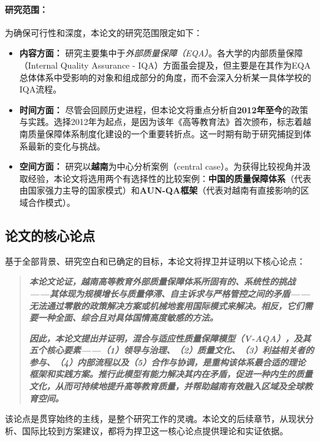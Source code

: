 \paragraph{研究范围：}
为确保可行性和深度，本论文的研究范围限定如下：
\begin{itemize}
    \item \textbf{内容方面：} 研究主要集中于\textit{外部质量保障（EQA）}。各大学的内部质量保障（Internal Quality Assurance - IQA）方面虽会提及，但主要是在其作为EQA总体体系中受影响的对象和组成部分的角度，而不会深入分析某一具体学校的IQA流程。
    
    \item \textbf{时间方面：} 尽管会回顾历史进程，但本论文将重点分析自\textbf{2012年至今}的政策与实践。选择2012年为起点，是因为该年《高等教育法》首次颁布，标志着越南质量保障体系制度化建设的一个重要转折点。这一时期有助于研究捕捉到体系最新的变化与挑战。
    
    \item \textbf{空间方面：} 研究以\textbf{越南}为中心分析案例（central case）。为获得比较视角并汲取经验，本论文将选用两个有选择性的比较案例：\textbf{中国的质量保障体系}（代表由国家强力主导的国家模式）和\textbf{AUN-QA框架}（代表对越南有直接影响的区域合作模式）。
\end{itemize}

\subsection{论文的核心论点}
\label{subsec:luan_diem_chinh}

基于全部背景、研究空白和已确定的目标，本论文将捍卫并证明以下核心论点：

\begin{quote}
\textit{\textbf{
本论文论证，越南高等教育外部质量保障体系所固有的、系统性的挑战——其体现为规模增长与质量停滞、自主诉求与严格管控之间的矛盾——无法通过零散的政策解决方案或机械地套用国际模式来解决。相反，它们需要一种全面、综合且对具体国情高度敏感的方法。
}}

\textit{\textbf{
因此，本论文提出并证明，混合与适应性质量保障模型（V-AQA），及其五个核心要素——（1）领导与治理、（2）质量文化、（3）利益相关者的参与、（4）内部流程以及（5）合作与协调，是重构该体系最合适的理论框架和实践方案。推行此模型有能力解决其内在矛盾，促进一种内生的质量文化，从而可持续地提升高等教育质量，并帮助越南有效融入区域及全球教育空间。
}}
\end{quote}

该论点是贯穿始终的主线，是整个研究工作的灵魂。本论文的后续章节，从现状分析、国际比较到方案建议，都将为捍卫这一核心论点提供理论和实证依据。

